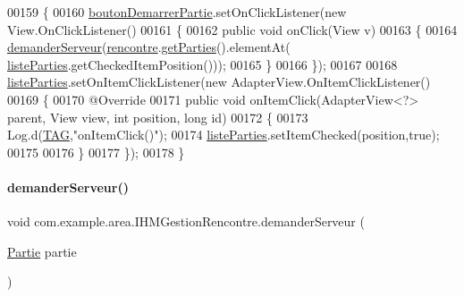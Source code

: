 \begin{DoxyCode}
00159     \{
00160         \hyperlink{classcom_1_1example_1_1area_1_1_i_h_m_gestion_rencontre_a29f52b3b1397d21728bbe60b826facd8}{boutonDemarrerPartie}.setOnClickListener(\textcolor{keyword}{new} View.OnClickListener()
00161         \{
00162             \textcolor{keyword}{public} \textcolor{keywordtype}{void} onClick(View v)
00163             \{
00164                 \hyperlink{classcom_1_1example_1_1area_1_1_i_h_m_gestion_rencontre_a34d405f3c30f6d040b2db3a6ee54a2f4}{demanderServeur}(\hyperlink{classcom_1_1example_1_1area_1_1_i_h_m_gestion_rencontre_aa3ecacbd8ab104d2a3c3f3e727ae6c5c}{rencontre}.\hyperlink{classcom_1_1example_1_1area_1_1_rencontre_a58b62bd2f8a63f532df2bc8607268a2d}{getParties}().elementAt(
      \hyperlink{classcom_1_1example_1_1area_1_1_i_h_m_gestion_rencontre_a127e07e7de6ff7e02fa84c52a3399aaa}{listeParties}.getCheckedItemPosition()));
00165             \}
00166         \});
00167 
00168         \hyperlink{classcom_1_1example_1_1area_1_1_i_h_m_gestion_rencontre_a127e07e7de6ff7e02fa84c52a3399aaa}{listeParties}.setOnItemClickListener(\textcolor{keyword}{new} AdapterView.OnItemClickListener()
00169         \{
00170             @Override
00171             \textcolor{keyword}{public} \textcolor{keywordtype}{void} onItemClick(AdapterView<?> parent, View view, \textcolor{keywordtype}{int} position, \textcolor{keywordtype}{long} \textcolor{keywordtype}{id})
00172             \{
00173                 Log.d(\hyperlink{classcom_1_1example_1_1area_1_1_i_h_m_gestion_rencontre_a0ac4d9152d48619cd697c8c69166219f}{TAG},\textcolor{stringliteral}{"onItemClick()"});
00174                 \hyperlink{classcom_1_1example_1_1area_1_1_i_h_m_gestion_rencontre_a127e07e7de6ff7e02fa84c52a3399aaa}{listeParties}.setItemChecked(position,\textcolor{keyword}{true});
00175 
00176             \}
00177         \});
00178     \}
\end{DoxyCode}
\mbox{\label{classcom_1_1example_1_1area_1_1_i_h_m_gestion_rencontre_a34d405f3c30f6d040b2db3a6ee54a2f4}} 
\paragraph{\texorpdfstring{demander\+Serveur()}{demanderServeur()}}
{\footnotesize\ttfamily void com.\+example.\+area.\+I\+H\+M\+Gestion\+Rencontre.\+demander\+Serveur (\begin{DoxyParamCaption}\item[{\hyperlink{classcom_1_1example_1_1area_1_1_partie}{Partie}}]{partie }\end{DoxyParamCaption})\hspace{0.3cm}{\ttfamily [private]}}



